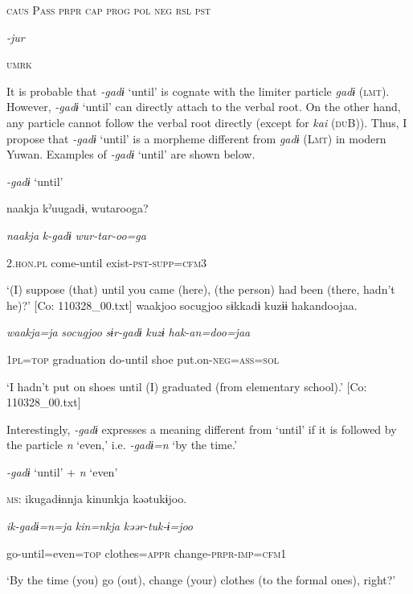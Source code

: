    \textsc{caus}  P\textsc{ass}  \textsc{prpr}  \textsc{cap}  \textsc{prog}  \textsc{pol}  \textsc{neg}  \textsc{rsl}  \textsc{pst}

          \textit{{}-jur} 

          \textsc{umrk}

It is probable that \textit{{}-gadɨ} ‘until’ is cognate with the limiter particle \textit{gadɨ} (\textsc{lmt}). However, \textit{{}-gadɨ} ‘until’ can directly attach to the verbal root. On the other hand, any particle cannot follow the verbal root directly (except for \textit{kai} (\textsc{du}B)). Thus, I propose that \textit{{}-gadɨ} ‘until’ is a morpheme different from \textit{gadɨ} (L\textsc{mt}) in modern Yuwan. Examples of \textit{{}-gadɨ} ‘until’ are shown below.

\ea\label{ex:8-95}
  \textit{{}-gadɨ} ‘until’

\ea {\TM}
\glll  naakja  kˀuugadɨ,  wutarooga?

      \textit{naakja}  \textit{k-gadɨ}  \textit{wur-tar-oo=ga}

      2.\textsc{hon}.\textsc{pl}  come-until  exist-\textsc{pst}-\textsc{supp}=\textsc{cfm}3

\glt ‘(I) suppose (that) until you came (here), (the person) had been (there, hadn’t he)?’ [Co: 110328\_00.txt]
\ex {\TM}
\glll  waakjoo  {\textbar}socugjoo{\textbar}  sɨkkadɨ  kuzɨɨ  hakandoojaa.

      \textit{waakja=ja}  \textit{socugjoo}  \textit{sɨr-gadɨ}  \textit{kuzɨ}  \textit{hak-an=doo=jaa}

      1\textsc{pl}=\textsc{top}  graduation  do-until  shoe  put.on-\textsc{neg}=\textsc{ass}=\textsc{sol}

\glt ‘I hadn’t put on shoes until (I) graduated (from elementary school).’ [Co: 110328\_00.txt]
\z

Interestingly, \textit{{}-gadɨ} expresses a meaning different from ‘until’ if it is followed by the particle \textit{n} ‘even,’ i.e. \textit{{}-gadɨ=n} ‘by the time.’

\ea\label{ex:8-96}
  \textit{{}-gadɨ} ‘until’ + \textit{n} ‘even’

  \textsc{ms}:  ikugadɨnnja  kinunkja  kəətukɨjoo.

    \textit{ik-gadɨ=n=ja}  \textit{kin=nkja}  \textit{kəər-tuk-ɨ=joo}

    go-until=even=\textsc{top}  clothes=\textsc{appr}  change-\textsc{prpr}-\textsc{imp}=\textsc{cfm1}

    ‘By the time (you) go (out), change (your) clothes (to the formal ones), right?’


